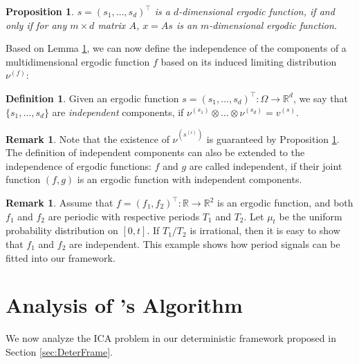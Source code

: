 \documentclass[twoside]{article}
\newcommand{\scom}[1]{s_{#1}}
\newcommand{\real}{\mathbb{R}}
\newtheorem{prop}[lemma]{Proposition}
\theoremstyle{definition}
\newtheorem{definition}[lemma]{Definition}
\newtheorem{remark}[lemma]{Remark}
\begin{document}
\begin{prop}\label{prop:comp}
$s = (\scom{1},\ldots,\scom{d})^{\top}$ is a $d$-dimensional ergodic function, if and only if 
 for any $m\times d$ matrix $A$, $x = A s$ is an $m$-dimensional ergodic function.
\end{prop}  
Based on Lemma \ref{prop:comp}, we can now define the independence of the components of a multidimensional ergodic function $f$ based on its induced limiting distribution $\nu^{(f)}$:
\begin{definition}
Given an ergodic function $s = (\scom{1},\ldots, \scom{d})^{\top}:\Omega \rightarrow \real^d$, 
we say that $\{\scom{1},\ldots, \scom{d}\}$ are \emph{independent} components, 
	if $\nu^{(\scom{1})}\otimes\ldots\otimes\nu^{(\scom{d})} = v^{(s)}$.
\end{definition}
\begin{remark}
Note that the existence of $\nu^{(s^{(i)})}$ is guaranteed by Proposition \ref{prop:comp}. 
The definition of independent components can also be extended to the independence of ergodic functions: 
$f$ and $g$ are called independent, if their joint function $(f,g)$ is an ergodic function with independent components. 
\end{remark}
\begin{remark}
Assume that $f = (f_1,f_2)^{\top}:\real\rightarrow\real^2$ is an ergodic function, and both $f_1$ and $f_2$ are periodic with respective periods $T_1$ and $T_2$. 
Let $\mu_t$ be the uniform probability distribution on $[0,t]$. 
 If $T_1/T_2$ is irrational, then it is easy to show that $f_1$ and $f_2$ are independent. 
 This example shows how period signals can be fitted into our framework.
\end{remark}
\fi

\section{Analysis of \citet{hsu2013learning}'s Algorithm}
\label{sec:Results}

We now analyze the ICA problem in our deterministic framework proposed in Section \ref{sec:DeterFrame}.
\end{document}
